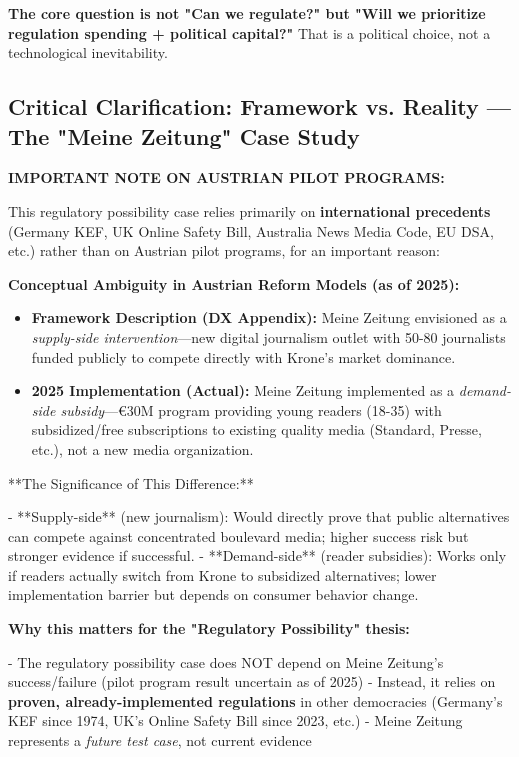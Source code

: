\textbf{The core question is not "Can we regulate?" but "Will we prioritize regulation spending + political capital?"} That is a political choice, not a technological inevitability.

\subsection*{Critical Clarification: Framework vs. Reality — The "Meine Zeitung" Case Study}

\textbf{IMPORTANT NOTE ON AUSTRIAN PILOT PROGRAMS:}

This regulatory possibility case relies primarily on \textbf{international precedents} (Germany KEF, UK Online Safety Bill, Australia News Media Code, EU DSA, etc.) rather than on Austrian pilot programs, for an important reason:

\textbf{Conceptual Ambiguity in Austrian Reform Models (as of 2025):}

\begin{itemize}
\item \textbf{Framework Description (DX Appendix):} Meine Zeitung envisioned as a \textit{supply-side intervention}—new digital journalism outlet with 50-80 journalists funded publicly to compete directly with Krone's market dominance.
\item \textbf{2025 Implementation (Actual):} Meine Zeitung implemented as a \textit{demand-side subsidy}—€30M program providing young readers (18-35) with subsidized/free subscriptions to existing quality media (Standard, Presse, etc.), not a new media organization.
\end{itemize}

**The Significance of This Difference:**

- **Supply-side** (new journalism): Would directly prove that public alternatives can compete against concentrated boulevard media; higher success risk but stronger evidence if successful.
- **Demand-side** (reader subsidies): Works only if readers actually switch from Krone to subsidized alternatives; lower implementation barrier but depends on consumer behavior change.

\textbf{Why this matters for the "Regulatory Possibility" thesis:}

- The regulatory possibility case does NOT depend on Meine Zeitung's success/failure (pilot program result uncertain as of 2025)
- Instead, it relies on \textbf{proven, already-implemented regulations} in other democracies (Germany's KEF since 1974, UK's Online Safety Bill since 2023, etc.)
- Meine Zeitung represents a \textit{future test case}, not current evidence

